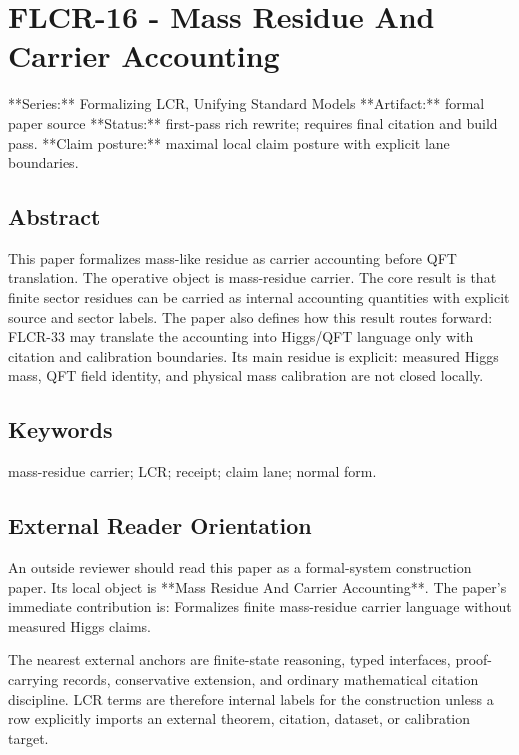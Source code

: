 \documentclass[11pt]{article}
\begin{document}
\section*{FLCR-16 - Mass Residue And Carrier Accounting}

**Series:** Formalizing LCR, Unifying Standard Models
**Artifact:** formal paper source
**Status:** first-pass rich rewrite; requires final citation and build pass.
**Claim posture:** maximal local claim posture with explicit lane boundaries.

\subsection*{Abstract}

This paper formalizes mass-like residue as carrier accounting before QFT translation. The operative object is mass-residue carrier. The core result is that finite sector residues can be carried as internal accounting quantities with explicit source and sector labels. The paper also defines how this result routes forward: FLCR-33 may translate the accounting into Higgs/QFT language only with citation and calibration boundaries. Its main residue is explicit: measured Higgs mass, QFT field identity, and physical mass calibration are not closed locally.

\subsection*{Keywords}

mass-residue carrier; LCR; receipt; claim lane; normal form.

\subsection*{External Reader Orientation}

An outside reviewer should read this paper as a formal-system construction paper. Its local object is **Mass Residue And Carrier Accounting**. The paper's immediate contribution is: Formalizes finite mass-residue carrier language without measured Higgs claims.

The nearest external anchors are finite-state reasoning, typed interfaces, proof-carrying records, conservative extension, and ordinary mathematical citation discipline. LCR terms are therefore internal labels for the construction unless a row explicitly imports an external theorem, citation, dataset, or calibration target.
\end{document}
